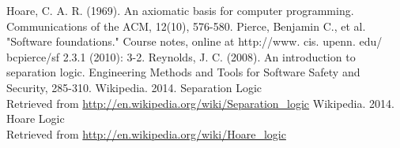
\begin{thebibliography}{}
    \bibitem{}
    	Hoare, C. A. R. (1969). An axiomatic basis for computer programming. Communications of the ACM, 12(10), 576-580.
    	Pierce, Benjamin C., et al. "Software foundations." Course notes, online at http://www. cis. upenn. edu/~ bcpierce/sf 2.3.1 (2010): 3-2.
    \bibitem{}
    	Reynolds, J. C. (2008). An introduction to separation logic. Engineering Methods and Tools for Software Safety and Security, 285-310.
        Wikipedia. 2014. Separation Logic\\ Retrieved from \url{http://en.wikipedia.org/wiki/Separation\_logic}
        Wikipedia. 2014. Hoare Logic\\ Retrieved from \url{http://en.wikipedia.org/wiki/Hoare_logic}
\end{thebibliography}